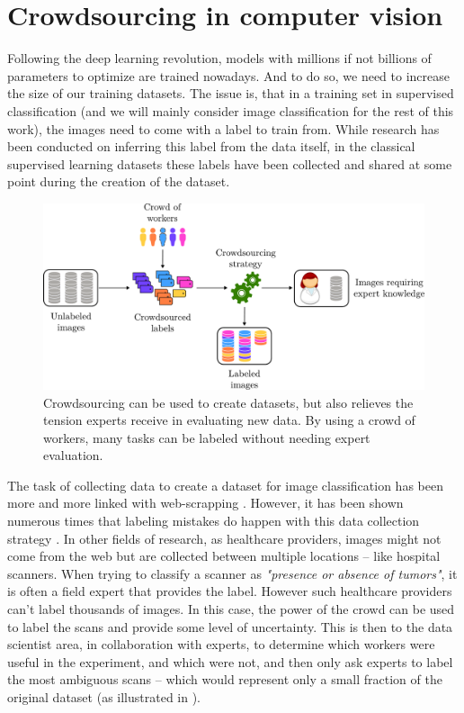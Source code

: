 \section{Crowdsourcing in computer vision}

Following the deep learning revolution, models with millions if not billions of parameters to optimize are trained nowadays. And to do so, we need to increase the size of our training datasets.
The issue is, that in a training set in supervised classification (and we will mainly consider image classification for the rest of this work), the images need to come with a label to train from.
While research has been conducted on inferring this label from the data itself, in the classical supervised learning datasets these labels have been collected and shared at some point during the creation of the dataset.

\begin{figure}[ht]
    \centering
    \includegraphics[width=.8\textwidth]{chapters/images/expert_knowledge.pdf}
    \caption{Crowdsourcing can be used to create datasets, but also relieves the tension experts receive in evaluating new data. By using a crowd of workers, many tasks can be labeled without needing expert evaluation.}
    \label{fig:expert_knowledge}
\end{figure}

The task of collecting data to create a dataset for image classification has been more and more linked with web-scrapping \citep{rhodes2015vaping}.
However, it has been shown numerous times that labeling mistakes do happen with this data collection strategy \citep{northcutt_pervasive_2021,vasudevan2022does}.
In other fields of research, as healthcare providers, images might not come from the web but are collected between multiple locations -- like hospital scanners.
When trying to classify a scanner as \emph{"presence or absence of tumors"}, it is often a field expert that provides the label.
However such healthcare providers can't label thousands of images.
In this case, the power of the crowd can be used to label the scans and provide some level of uncertainty.
This is then to the data scientist area, in collaboration with experts, to determine which workers were useful in the experiment, and which were not, and then only ask experts to label the most ambiguous scans -- which would represent only a small fraction of the original dataset (as illustrated in ).

